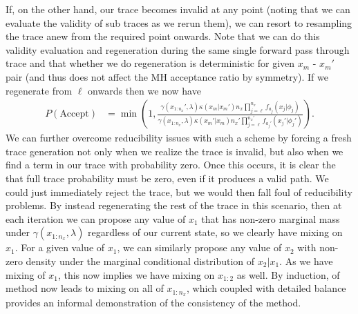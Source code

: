 If, on the other hand, our trace becomes invalid
at any point (noting that we can evaluate the validity of sub traces as we rerun them), we can resort to
resampling the trace anew from the required point onwards.  Note that we can do this validity evaluation
and regeneration during the same single forward pass through trace and that whether we do regeneration
is deterministic for given $x_m$ - $x_m'$ pair (and thus does not affect the MH acceptance ratio by symmetry).
If we regenerate from \sample $\ell$ onwards then we now have
\begin{align}
P(\text{Accept}) &= \min\left(1, \frac{\gamma(x_{1:n_x}',\lambda) \kappa(x_m | x_{m}') n_x \prod_{j=\ell}^{n_x} f_{a_{j}} (x_j | \phi_j)}
{\gamma(x_{1:n_x},\lambda) \kappa(x_m' | x_{m})  n_x' \prod_{j=\ell}^{n_x'} f_{a_{j}'} (x_j' | \phi_j')}\right).
\end{align}
We can further overcome reducibility issues with such a scheme by forcing a fresh trace generation
not only when we realize the trace is invalid, but also when we find a term in our trace with probability zero.
Once this occurs, it is clear the that full trace probability must be zero, even if it produces a valid path.  We
could just immediately reject the trace, but we would then fall foul of reducibility problems.  By instead
regenerating the rest of the trace in this scenario, then at each iteration we can propose any value of $x_1$ that has non-zero marginal
mass under $\gamma(x_{1:n_x},\lambda)$ regardless of our current state, so we clearly have mixing on $x_1$.
For a given value of $x_1$, we can similarly propose any value of $x_2$ with non-zero density under the
marginal conditional distribution of $x_2|x_1$.  As we have mixing of $x_1$, this now implies we have
mixing on $x_{1:2}$ as well.  By induction, of method now leads to mixing on all of $x_{1:n_x}$, which
coupled with detailed balance provides an informal demonstration of the consistency of the method.

